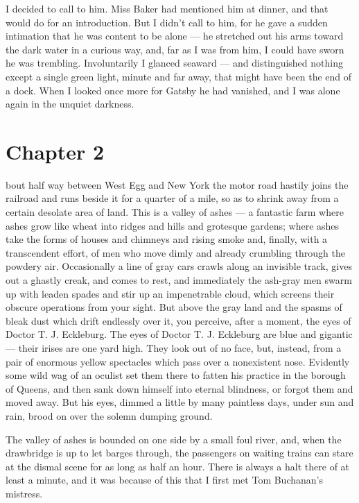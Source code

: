\documentclass{znotebook}
\begin{document}
I decided to call to him. Miss Baker had mentioned him at dinner, and that would do for an introduction. But I didn't call to him, for he gave a sudden intimation that he was content to be alone — he stretched out his arms toward the dark water in a curious way, and, far as I was from him, I could have sworn he was trembling. Involuntarily I glanced seaward — and distinguished nothing except a single green light, minute and far away, that might have been the end of a dock. When I looked once more for Gatsby he had vanished, and I was alone again in the unquiet darkness.

\chapter{Chapter 2}

\lettrine[findent=2pt]{}{ }bout half way between West Egg and New York the motor road hastily joins the railroad and runs beside it for a quarter of a mile, so as to shrink away from a certain desolate area of land. This is a valley of ashes — a fantastic farm where ashes grow like wheat into ridges and hills and grotesque gardens; where ashes take the forms of houses and chimneys and rising smoke and, finally, with a transcendent effort, of men who move dimly and already crumbling through the powdery air. Occasionally a line of gray cars crawls along an invisible track, gives out a ghastly creak, and comes to rest, and immediately the ash-gray men swarm up with leaden spades and stir up an impenetrable cloud, which screens their obscure operations from your sight. But above the gray land and the spasms of bleak dust which drift endlessly over it, you perceive, after a moment, the eyes of Doctor T. J. Eckleburg. The eyes of Doctor T. J. Eckleburg are blue and gigantic — their irises are one yard high. They look out of no face, but, instead, from a pair of enormous yellow spectacles which pass over a nonexistent nose. Evidently some wild wag of an oculist set them there to fatten his practice in the borough of Queens, and then sank down himself into eternal blindness, or forgot them and moved away. But his eyes, dimmed a little by many paintless days, under sun and rain, brood on over the solemn dumping ground.

The valley of ashes is bounded on one side by a small foul river, and, when the drawbridge is up to let barges through, the passengers on waiting trains can stare at the dismal scene for as long as half an hour. There is always a halt there of at least a minute, and it was because of this that I first met Tom Buchanan's mistress.
\end{document}
